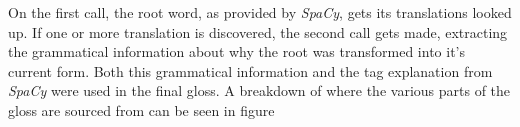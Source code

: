 

On the first call, the root word, as provided by \textit{SpaCy}, gets its translations looked up. If one or more translation is discovered, the second call gets made, extracting the grammatical information about why the root was transformed into it's current form. Both this grammatical information and the tag explanation from \textit{SpaCy} were used in the final gloss. A breakdown of where the various parts of the gloss are sourced from can be seen in figure 

